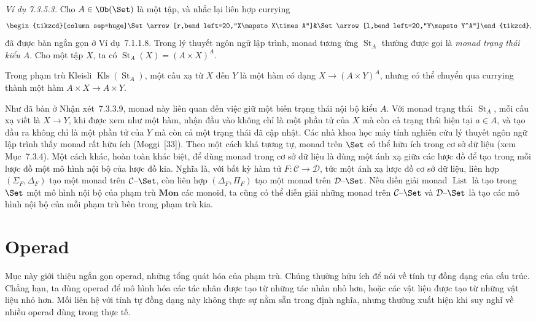 \noindent\textit{Ví dụ 7.3.5.3.}\keepwithnext
Cho $A\in\Ob(\Set)$ là một tập, và nhắc lại liên hợp currying
\[
\begin{tikzcd}[column sep=huge]\Set\arrow[r,bend left=20,"X\mapsto X\times A"]&\Set\arrow[l,bend left=20,"Y\mapsto Y^A"]\end{tikzcd},
\]
đã được bàn ngắn gọn ở Ví dụ~7.1.1.8. Trong lý thuyết ngôn ngữ lập trình, monad tương ứng $\operatorname{St}_A$ thường được gọi là \emph{monad trạng thái kiểu $A$}. Cho một tập $X$, ta có $\operatorname{St}_A(X)=(A\times X)^A$.

Trong phạm trù Kleisli $\operatorname{Kls}(\operatorname{St}_A)$, một cấu xạ từ $X$ đến $Y$ là một hàm có dạng $X\to(A\times Y)^A$, nhưng có thể chuyển qua currying thành một hàm $A\times X\to A\times Y$.

Như đã bàn ở Nhận xét~7.3.3.9, monad này liên quan đến việc giữ một biến trạng thái nội bộ kiểu $A$. Với monad trạng thái $\operatorname{St}_A$, mỗi cấu xạ viết là $X\to Y$, khi được xem như một hàm, nhận đầu vào không chỉ là một phần tử của $X$ mà còn cả trạng thái hiện tại $a\in A$, và tạo đầu ra không chỉ là một phần tử của $Y$ mà còn cả một trạng thái đã cập nhật.
Các nhà khoa học máy tính nghiên cứu lý thuyết ngôn ngữ lập trình thấy monad rất hữu ích (Moggi~[33]). Theo một cách khá tương tự, monad trên $\Set$ có thể hữu ích trong cơ sở dữ liệu (xem Mục~7.3.4). Một cách khác, hoàn toàn khác biệt, để dùng monad trong cơ sở dữ liệu là dùng một ánh xạ giữa các lược đồ để tạo trong mỗi lược đồ một mô hình nội bộ của lược đồ kia. Nghĩa là, với bất kỳ hàm tử $F:\mathcal C\to\mathcal D$, tức một ánh xạ lược đồ cơ sở dữ liệu, liên hợp $(\Sigma_F,\Delta_F)$ tạo một monad trên $\mathcal C\text{--}\Set$, còn liên hợp $(\Delta_F,\Pi_F)$ tạo một monad trên $\mathcal D\text{--}\Set$. Nếu diễn giải monad $\operatorname{List}$ là tạo trong $\Set$ một mô hình nội bộ của phạm trù $\mathbf{Mon}$ các monoid, ta cũng có thể diễn giải những monad trên $\mathcal C\text{--}\Set$ và $\mathcal D\text{--}\Set$ là tạo các mô hình nội bộ của mỗi phạm trù bên trong phạm trù kia.

\section{Operad}
Mục này giới thiệu ngắn gọn operad, những tổng quát hóa của phạm trù. Chúng thường hữu ích để nói về tính tự đồng dạng của cấu trúc. Chẳng hạn, ta dùng operad để mô hình hóa các tác nhân được tạo từ những tác nhân nhỏ hơn, hoặc các vật liệu được tạo từ những vật liệu nhỏ hơn. Mối liên hệ với tính tự đồng dạng này không thực sự nằm sẵn trong định nghĩa, nhưng thường xuất hiện khi suy nghĩ về nhiều operad dùng trong thực tế.

